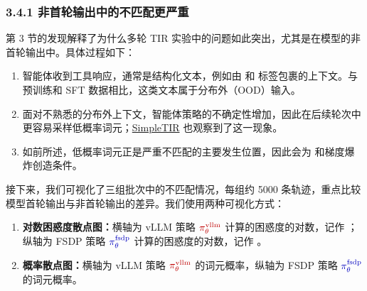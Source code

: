 
\hypertarget{src-277211a5-58b7-80d0-9d87-e202276dc7f9}{}
\subsubsection*{3.4.1 非首轮输出中的不匹配更严重}



第 3 节的发现解释了为什么多轮 TIR 实验中的问题如此突出，尤其是在模型的非首轮输出中。具体过程如下：



\begin{enumerate}

\item 智能体收到工具响应，通常是结构化文本，例如由  和  标签包裹的上下文。与预训练和 SFT 数据相比，这类文本属于分布外（OOD）输入。


\item 面对不熟悉的分布外上下文，智能体策略的不确定性增加，因此在后续轮次中更容易采样低概率词元；\href{https://github.com/ltzheng/SimpleTIR}{SimpleTIR} 也观察到了这一现象。


\item 如前所述，低概率词元正是严重不匹配的主要发生位置，因此会为  和梯度爆炸创造条件。

\end{enumerate}


接下来，我们可视化了三组批次中的不匹配情况，每组约 5000 条轨迹，重点比较模型首轮输出与非首轮输出的差异。我们使用两种可视化方式：



\begin{enumerate}

\item \textbf{对数困惑度散点图：}横轴为 vLLM 策略 $\piv$ 计算的困惑度的对数，记作 ；纵轴为 FSDP 策略 $\pif$ 计算的困惑度的对数，记作 。


\item \textbf{概率散点图：}横轴为 vLLM 策略 $\piv$ 的词元概率，纵轴为 FSDP 策略 $\pif$ 的词元概率。

\end{enumerate}

